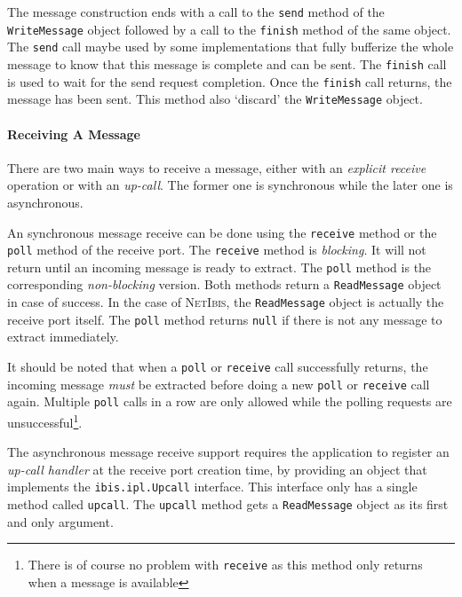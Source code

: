 \documentclass[11pt]{book}
\def\NetIbis{\textsc{NetIbis}\xspace}
\begin{document}
The message construction ends with a call to the \texttt{send} method
of the \texttt{WriteMessage} object followed by a call to the
\texttt{finish} method of the same object. The \texttt{send} call
maybe used by some implementations that fully bufferize the whole
message to know that this message is complete and can be sent. The
\texttt{finish} call is used to wait for the send request completion.
Once the \texttt{finish} call returns, the message has been sent.
This method also `discard' the \texttt{WriteMessage} object.

\paragraph{Receiving A Message}
\label{sec:receiving-message}

There are two main ways to receive a message, either with an
\emph{explicit receive} operation or with an \emph{up-call}. The former
one is synchronous while the later one is asynchronous.

An synchronous message receive can be done using the \texttt{receive}
method or the \texttt{poll} method of the receive port. The
\texttt{receive} method is \emph{blocking}. It will not return until
an incoming message is ready to extract. The \texttt{poll} method is
the corresponding \emph{non-blocking} version. Both methods return a
\texttt{ReadMessage} object in case of success. In the case of
\NetIbis, the \texttt{ReadMessage} object is actually the receive port
itself. The \texttt{poll} method returns \texttt{null} if there is not
any message to extract immediately.

It should be noted that when a \texttt{poll} or \texttt{receive} call
successfully returns, the incoming message \emph{must} be extracted
before doing a new \texttt{poll} or \texttt{receive} call again.
Multiple \texttt{poll} calls in a row are only allowed while the
polling requests are unsuccessful\footnote{There is of course no
  problem with \texttt{receive} as this method only returns when a
  message is available}.

The asynchronous message receive support requires the application to
register an \emph{up-call handler} at the receive port creation time,
by providing an object that implements the \texttt{ibis.ipl.Upcall}
interface. This interface only has a single method called
\texttt{upcall}. The \texttt{upcall} method gets a
\texttt{ReadMessage} object as its first and only argument.
\end{document}
